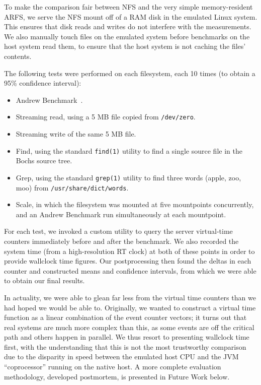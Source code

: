 \documentclass[10pt]{article}
\begin{document}
To make the comparison fair between NFS and the very simple
memory-resident ARFS, we serve the NFS mount off of a RAM disk in the
emulated Linux system. This ensures that disk reads and writes do not
interfere with the measurements. We also manually touch files on the
emulated system before benchmarks on the host system read them, to
ensure that the host system is not caching the files' contents.

The following tests were performed on each filesystem, each 10 times
(to obtain a 95\% confidence interval):

\begin{itemize}
\item Andrew Benchmark~\cite{ab}.
\item Streaming read, using a 5 MB file copied from {\tt /dev/zero}.
\item Streaming write of the same 5 MB file.
\item Find, using the standard {\tt find(1)} utility to find a single source file in the Bochs source tree.
\item Grep, using the standard {\tt grep(1)} utility to find three
  words (apple, zoo, moo) from {\tt /usr/share/dict/words}.
\item Scale, in which the filesystem was mounted at five mountpoints
  concurrently, and an Andrew Benchmark run simultaneously at each
  mountpoint.
\end{itemize}

For each test, we invoked a custom utility to query the server
virtual-time counters immediately before and after the benchmark. We
also recorded the system time (from a high-resolution RT clock) at
both of these points in order to provide wallclock time figures. Our
postprocessing then found the deltas in each counter and constructed
means and confidence intervals, from which we were able to obtain our
final results.

In actuality, we were able to glean far less from the virtual time
counters than we had hoped we would be able to. Originally, we wanted
to construct a virtual time function as a linear combination of the
event counter vectors; it turns out that real systems are much more
complex than this, as some events are off the critical path and others
happen in parallel. We thus resort to presenting wallclock time first,
with the understanding that this is not the most trustworthy
comparison due to the disparity in speed between the emulated host CPU
and the JVM ``coprocessor'' running on the native host. A more
complete evaluation methodology, developed postmortem, is presented in
Future Work below.
\end{document}
